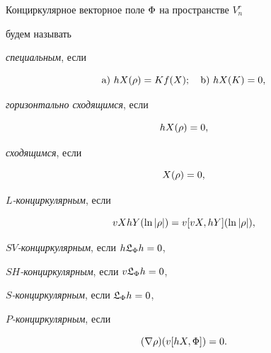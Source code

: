 \begin{defn}


Конциркулярное векторное поле $\Phi$ на пространстве $V^r_n$


будем называть





{\it специальным}, если


\begin{equation}


\mathrm a)\ hX(\ro)=Kf(X);\quad \mathrm b)\ hX(K)=0,


\end{equation}





{\it горизонтально сходящимся}, если


\begin{equation}


hX(\ro)=0,


\end{equation}





{\it сходящимся}, если


\begin{equation}


X(\ro)=0,


\end{equation}


\pagebreak





{\it $L$-конциркулярным}, если


\begin{equation}


vXhY(\ln{|\ro|})=v[vX,hY](\ln{|\ro|}),


\end{equation}





{\it $SV$-конциркулярным}, если $h\frak {L}_{\Phi}h=0$,





{\it $SH$-конциркулярным}, если $v\frak {L}_{\Phi}h=0$,





{\it $S$-конциркулярным}, если $\frak {L}_{\Phi}h=0$,





{\it $P$-конциркулярным}, если


\begin{equation}


(\nb\ro)(v[hX,\F])=0.


\end{equation}


\end{defn}





